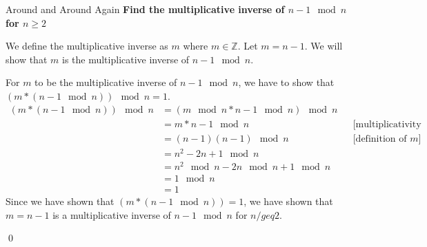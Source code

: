 \documentclass[11pt, nopagenumbers]{adamblan-hw}
\begin{document}
\begin{question}{Around and Around Again}
\textbf{Find the multiplicative inverse of $n-1\mod{n}$ for $n \geq 2$}

We define the multiplicative inverse as $m$ where $m \in \mathbb{Z}$. Let $m = n - 1$.
We will show that $m$ is the multiplicative inverse of $n - 1 \mod{n}$.

For $m$ to be the multiplicative inverse of $n - 1 \mod{n}$, we have to show that $(m * (n - 1 \mod n)) \mod n = 1$.
\begin{align*}
(m * (n - 1 \mod n)) \mod n &= (m \mod n * n - 1 \mod n) \mod n \\
&=m * n - 1 \mod n && \text{[multiplicativity of mod]} \\
&=(n - 1) (n - 1) \mod n && \text{[definition of $m$]}\\
&=n^2 - 2n + 1 \mod n \\
&=n^2 \mod n - 2n \mod n + 1 \mod n \\
&=1 \mod n \\
&=1
\end{align*}
Since we have shown that $(m * (n - 1 \mod n)) = 1$, we have shown that $m = n - 1$ is a multiplicative inverse
of $n - 1 \mod n$ for $n /geq 2$. 

\qed
\end{question}
\end{document}
